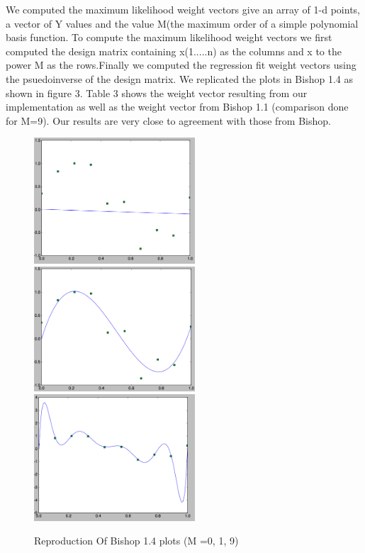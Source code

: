 \documentclass[pageno]{jpaper}
\begin{document}
We computed the maximum likelihood weight vectors give an array of 1-d points, a vector of Y values and the value M(the maximum order of a simple polynomial basis function. To compute the maximum likelihood weight vectors we first computed the design matrix containing x(1.....n) as the columns and x to the power M as the rows.Finally we computed the regression fit weight vectors using the psuedoinverse of the design matrix. We replicated the plots in Bishop 1.4 as shown in figure 3. Table 3 shows the weight vector resulting from our implementation as well as the weight vector from Bishop 1.1 (comparison done for M=9). Our results are very close to agreement with those from Bishop.
\begin{figure}[ht!]
\centering
\includegraphics[width=60mm]{M_1}
\includegraphics[width=60mm]{M_4}
\includegraphics[width=60mm]{M_2}
\caption{Reproduction Of Bishop 1.4 plots (M =0, 1, 9)}
\label{overflow}
\end{figure}
\end{document}
